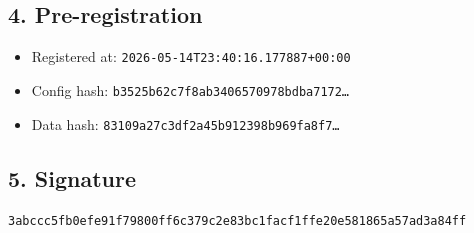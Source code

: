 \documentclass{article}
\begin{document}
\subsection*{4. Pre-registration}
\begin{itemize}
\item Registered at: \texttt{2026-05-14T23:40:16.177887+00:00}
\item Config hash: \texttt{b3525b62c7f8ab3406570978bdba7172\dots}
\item Data hash: \texttt{83109a27c3df2a45b912398b969fa8f7\dots}
\end{itemize}
\subsection*{5. Signature}
\texttt{3abccc5fb0efe91f79800ff6c379c2e83bc1facf1ffe20e581865a57ad3a84ff}\\
\end{document}
